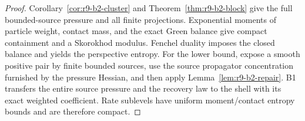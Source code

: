 \begin{proof}
Corollary~\ref{cor:r9-b2-cluster} and
Theorem~\ref{thm:r9-b2-block} give the full bounded-source pressure and all
finite projections.  Exponential moments of particle weight, contact mass,
and the exact Green balance give compact containment and a Skorokhod modulus.
Fenchel duality imposes the closed balance and yields the perspective entropy.
For the lower bound, expose a smooth positive pair by finite bounded sources,
use the source propagator concentration furnished by the pressure Hessian, and
then apply Lemma~\ref{lem:r9-b2-repair}.  B1 transfers the entire source
pressure and the recovery law to the shell with its exact weighted
coefficient.  Rate sublevels have uniform moment/contact entropy bounds and
are therefore compact.
\end{proof}
